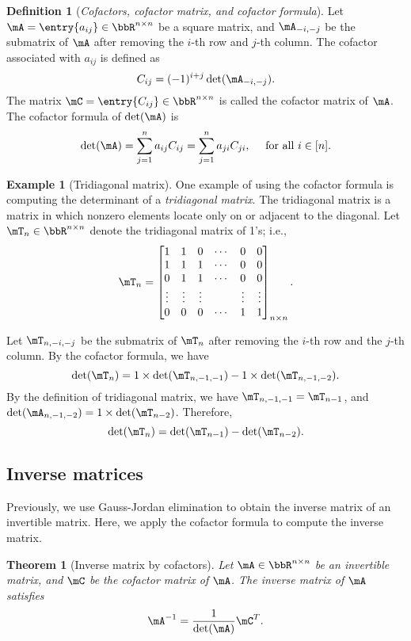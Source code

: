 \documentclass[11pt]{article}
\theoremstyle{plain}
\newtheorem{thm}{Theorem}[section]
\theoremstyle{definition}
\newtheorem{defn}{Definition}
\newtheorem{example}{Example}
\begin{document}
\begin{defn}[\textit{Cofactors, cofactor matrix, and cofactor formula}]
	Let $\mA=  \entry{a_{ij}} \in \bbR^{n \times n}$ be a square matrix, and $\mA_{-i,-j}$ be the submatrix of $\mA$ after removing the $i$-th row and $j$-th column. The cofactor associated with $a_{ij}$ is defined as \[C_{ij} = (-1)^{i+j}\det(\mA_{-i,-j}).\]
	The matrix $\mC = \entry{C_{ij}} \in \bbR^{n \times n}$ is called the cofactor matrix of $\mA$.  The cofactor formula of $\det(\mA)$ is
	\[ \det(\mA) = \sum_{j=1}^n a_{ij} C_{ij} = \sum_{j=1}^n a_{ji} C_{ji} ,\quad \text{ for all } i \in [n].  \]
\end{defn}

\begin{example}[Tridiagonal matrix]
	One example of using the cofactor formula is computing the determinant of a \textit{tridiagonal matrix}. The tridiagonal matrix is a matrix in which nonzero elements locate only on or adjacent to the diagonal. Let $\mT_n \in \bbR^{n \times n}$ denote the tridiagonal matrix of 1's; i.e.,
\begin{align}
	\mT_n = \begin{bmatrix}
		1 &1&0 &\cdots & 0 &0\\
		1&1&1&\cdots &0&0\\
		0&1&1&\cdots &0&0\\
		\vdots &\vdots &\vdots &&\vdots &\vdots \\
		0&0&0&\cdots&1&1
	\end{bmatrix}_{n \times n}.
\end{align} 

Let $\mT_{n, -i,-j}$ be the submatrix of  $\mT_n$ after removing the $i$-th row and the $j$-th column.   By the cofactor formula, we have
\[  \det(\mT_n) = 1 \times \det(\mT_{n, -1,-1}) - 1 \times \det(\mT_{n,-1,-2}). \]
By the definition of tridiagonal matrix, we have $\mT_{n,-1,-1} = \mT_{n-1}$, and $\det( \mA_{n,-1,-2}) = 1 \times \det(\mT_{n-2}) $. Therefore, 
\[ \det(\mT_n) = \det(\mT_{n-1}) - \det(\mT_{n-2}).  \] 
\end{example}

\subsection{Inverse matrices}
Previously, we use Gauss-Jordan elimination to obtain the inverse matrix of an invertible matrix. Here, we apply the cofactor formula to compute the inverse matrix.

\begin{thm}[Inverse matrix by cofactors]\label{thm:inver}
Let $\mA \in \bbR^{n \times n}$ be an invertible matrix, and $\mC$ be the cofactor matrix of $\mA$. The inverse matrix of $\mA$ satisfies
\[  \mA^{-1} = \frac{1}{\det(\mA)} \mC^T. \]	
\end{thm}
\end{document}
